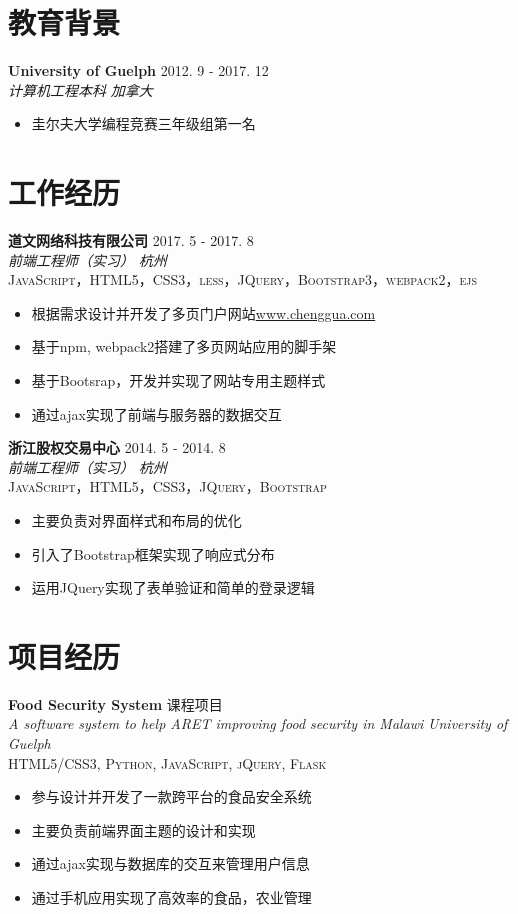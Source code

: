 \documentclass[10pt, letterpaper]{article}
\newcommand{\information}[4]{
	\noindent
    \textbf{\color{darktext}#1} \hfill {#2} \\
    \textit{\color{hardtext}#3} \hfill \textit{\color{awesome-emerald}#4}
}
\newcommand{\project}[6]{
	\noindent
    \textbf{\color{darktext}#1} \hfill {#2} \\
    \textit{\color{hardtext}#3} \hfill \textit{\color{awesome-emerald}#4}\\
    \textsc{#5}
    {#6}
    \vspace{10pt}
}
\begin{document}
\section*{教育背景}

\information
	{University of Guelph}{2012. 9 - 2017. 12}
	{计算机工程本科}{加拿大}
\begin{itemize}[leftmargin=*]
\item 圭尔夫大学编程竞赛三年级组第一名
\end{itemize}



\section*{工作经历}

\project{道文网络科技有限公司}{2017. 5 - 2017. 8}
{前端工程师（实习）}{杭州}
{JavaScript，HTML5，CSS3，less，JQuery，Bootstrap3，webpack2，ejs}
{\begin{itemize}[leftmargin=*]
  	\item 根据需求设计并开发了多页门户网站\href{www.chenggua.com}{www.chenggua.com}
  	\item 基于npm, webpack2搭建了多页网站应用的脚手架
    \item 基于Bootsrap，开发并实现了网站专用主题样式
    \item 通过ajax实现了前端与服务器的数据交互
\end{itemize}}

\project{浙江股权交易中心}{2014. 5 - 2014. 8}
{前端工程师（实习）}{杭州}
{JavaScript，HTML5，CSS3，JQuery，Bootstrap}
{\begin{itemize}[leftmargin=*]
    \item 主要负责对界面样式和布局的优化
    \item 引入了Bootstrap框架实现了响应式分布
    \item 运用JQuery实现了表单验证和简单的登录逻辑
\end{itemize}}

\section*{项目经历}

\project{Food Security System}{课程项目}
{A software system to help ARET improving food security in Malawi}{University of Guelph}
{HTML5/CSS3, Python, JavaScript, jQuery, Flask}
{\begin{itemize}[leftmargin=*]
    \item 参与设计并开发了一款跨平台的食品安全系统
    \item 主要负责前端界面主题的设计和实现
    \item 通过ajax实现与数据库的交互来管理用户信息
    \item 通过手机应用实现了高效率的食品，农业管理
\end{itemize}}
\end{document}
